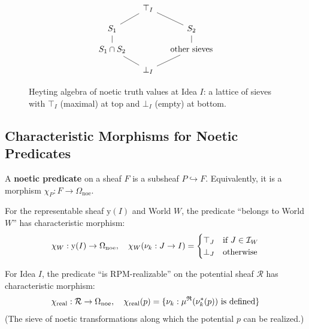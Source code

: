 \begin{figure}[ht]
\centering
\[
\begin{tikzcd}[row sep=small, column sep=small]
  & \top_I \arrow[dl, dash] \arrow[dr, dash] & \\
  S_1 \arrow[d, dash] & & S_2 \arrow[d, dash] \\
  S_1 \cap S_2 \arrow[dr, dash] & & \text{other sieves} \arrow[dl, dash] \\
  & \bot_I &
\end{tikzcd}
\]
\caption{Heyting algebra of noetic truth values at Idea $I$: a lattice of sieves
with $\top_I$ (maximal) at top and $\bot_I$ (empty) at bottom.}
\label{fig:noetic-truth-lattice}
\end{figure}

\subsection{Characteristic Morphisms for Noetic Predicates}
\label{subsec:characteristic-morphisms}

\begin{definition}
\label{def:noetic-predicate}
A \textbf{noetic predicate} on a sheaf $F$ is a subsheaf $P \hookrightarrow F$.
Equivalently, it is a morphism $\chi_P : F \to \Omega_{\mathrm{noe}}$.
\end{definition}

\begin{example}
\label{ex:world-membership}
For the representable sheaf $\mathrm{y}(I)$ and World $W$, the predicate
``belongs to World $W$'' has characteristic morphism:
\[
  \chi_W : \mathrm{y}(I) \to \Omega_{\mathrm{noe}}, \quad
  \chi_W(\nu_{k} : J \to I) = \begin{cases}
    \top_J & \text{if } J \in \mathcal{I}_W \\
    \bot_J & \text{otherwise}
  \end{cases}
\]
\end{example}

\begin{example}
\label{ex:rpm-realizability}
For Idea $I$, the predicate ``is RPM-realizable'' on the potential sheaf
$\mathcal{R}$ has characteristic morphism:
\[
  \chi_{\mathrm{real}} : \mathcal{R} \to \Omega_{\mathrm{noe}}, \quad
  \chi_{\mathrm{real}}(p) = \{\nu_{k} : \mu^{\mathfrak{R}}(\nu_{k}^*(p)) \text{ is defined}\}
\]
(The sieve of noetic transformations along which the potential $p$ can be realized.)
\end{example}

